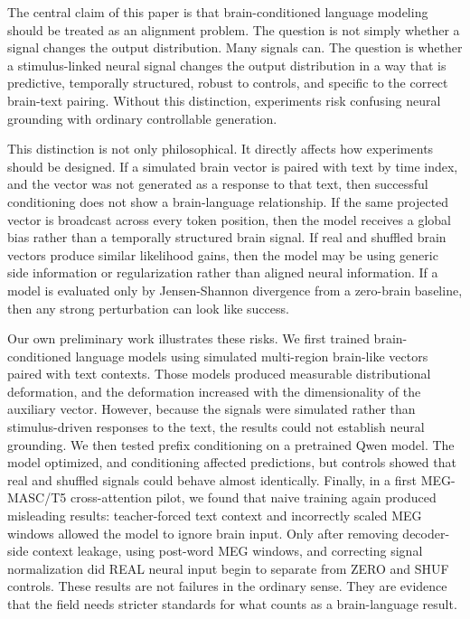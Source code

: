 \documentclass{article}
\begin{document}
The central claim of this paper is that brain-conditioned language modeling should be treated as an alignment problem.
The question is not simply whether a signal changes the output distribution.
Many signals can.
The question is whether a stimulus-linked neural signal changes the output distribution in a way that is predictive, temporally structured, robust to controls, and specific to the correct brain-text pairing.
Without this distinction, experiments risk confusing neural grounding with ordinary controllable generation.

This distinction is not only philosophical.
It directly affects how experiments should be designed.
If a simulated brain vector is paired with text by time index, and the vector was not generated as a response to that text, then successful conditioning does not show a brain-language relationship.
If the same projected vector is broadcast across every token position, then the model receives a global bias rather than a temporally structured brain signal.
If real and shuffled brain vectors produce similar likelihood gains, then the model may be using generic side information or regularization rather than aligned neural information.
If a model is evaluated only by Jensen-Shannon divergence from a zero-brain baseline, then any strong perturbation can look like success.

Our own preliminary work illustrates these risks.
We first trained brain-conditioned language models using simulated multi-region brain-like vectors paired with text contexts.
Those models produced measurable distributional deformation, and the deformation increased with the dimensionality of the auxiliary vector.
However, because the signals were simulated rather than stimulus-driven responses to the text, the results could not establish neural grounding.
We then tested prefix conditioning on a pretrained Qwen model.
The model optimized, and conditioning affected predictions, but controls showed that real and shuffled signals could behave almost identically.
Finally, in a first MEG-MASC/T5 cross-attention pilot, we found that naive training again produced misleading results: teacher-forced text context and incorrectly scaled MEG windows allowed the model to ignore brain input.
Only after removing decoder-side context leakage, using post-word MEG windows, and correcting signal normalization did REAL neural input begin to separate from ZERO and SHUF controls.
These results are not failures in the ordinary sense.
They are evidence that the field needs stricter standards for what counts as a brain-language result.
\end{document}
